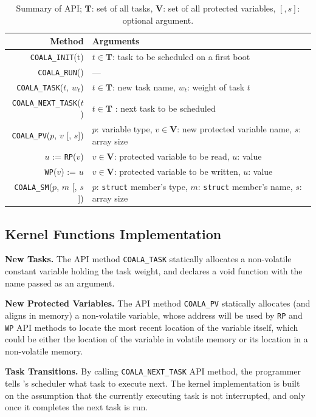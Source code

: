 \begin{table}
\centering
\begin{tabular}{| r | p{} |}
	\hline
	{Method} & {Arguments} \\
	\hline\hline
	\texttt{COALA\_INIT}(t) & $t \in \mathbf{T}$: task to be scheduled on a first boot \\
	\hline
	\texttt{COALA\_RUN}() & --- \\
	\hline
	\texttt{COALA\_TASK}($t$, $w_t$) & $t \in \mathbf{T}$: new task name, $w_t$: weight of task $t$ \\
	\hline
	\texttt{COALA\_NEXT\_TASK}($t$) & $t \in \mathbf{T}$ : next task to be scheduled\\
	\hline
	\texttt{COALA\_PV}($p$, $v$ [, $s$]) & $p$: variable type, $v \in \mathbf{V}$: new protected variable name, $s$: array size\\
	\hline
	$u$ := \texttt{RP}($v$) & $v \in \mathbf{V}$: protected variable to be read, $u$: value \\
	\hline	
	\texttt{WP}($v$) := $u$ &  $v \in \mathbf{V}$: protected variable to be written, $u$: value \\
	\hline
	\texttt{COALA\_SM}($p$, $m$ [, $s$]) & $p$: \texttt{struct} member's type, $m$: \texttt{struct} member's name, $s$: array size \\
	\hline
\end{tabular}
\caption{Summary of \sys API; $\mathbf{T}$: set of all tasks, $\mathbf{V}$: set of all protected variables, $[, s]$: optional argument.}
\label{table:coala_api}
\end{table}

\subsection{\sys Kernel Functions Implementation}

\textbf{New Tasks.} The API method \texttt{COALA\_TASK} statically allocates a non-volatile constant variable holding the task weight, and declares a void function with the name passed as an argument.

\textbf{New Protected Variables.} The API method \texttt{COALA\_PV} statically allocates (and aligns in memory) a non-volatile variable, whose address will be used by \texttt{RP} and \texttt{WP} API methods to locate the most recent location of the variable itself, which could be either the location of the variable in volatile memory or its location in a non-volatile memory.

\textbf{Task Transitions.} By calling \texttt{COALA\_NEXT\_TASK} API method, the programmer tells \sys's scheduler what task to execute next. The \sys kernel implementation is built on the assumption that the currently executing task is not interrupted, and only once it completes the next task is run. 

